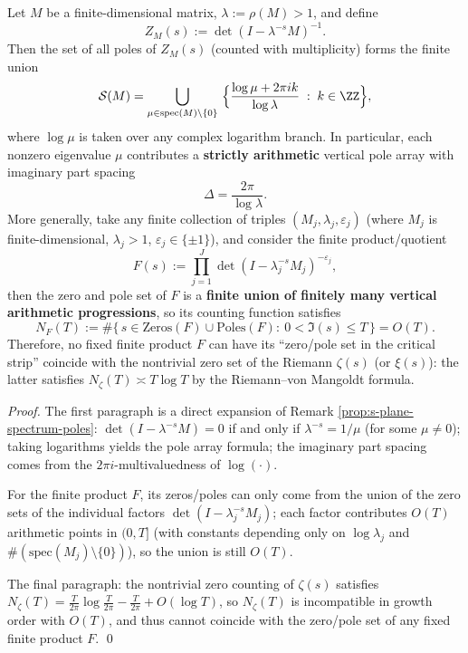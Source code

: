 \begin{proposition}\label{prop:finite-kernel-lattice-obstruction}
Let \(M\) be a finite-dimensional matrix, \(\lambda:=\rho(M)>1\), and define
\[
Z_M(s):=\det(I-\lambda^{-s}M)^{-1}.
\]
Then the set of all poles of \(Z_M(s)\) (counted with multiplicity) forms the finite union
\[
\mathcal{S}(M)=\bigcup_{\mu\in\mathrm{spec}(M)\setminus\{0\}}\ \Bigl\{\frac{\log\mu+2\pi i k}{\log\lambda}\;:\;k\in\ZZ\Bigr\},
\]
where \(\log\mu\) is taken over any complex logarithm branch. In particular, each nonzero eigenvalue \(\mu\) contributes a \textbf{strictly arithmetic} vertical pole array with imaginary part spacing
\[
\Delta=\frac{2\pi}{\log\lambda}.
\]
More generally, take any finite collection of triples \((M_j,\lambda_j,\varepsilon_j)\) (where \(M_j\) is finite-dimensional, \(\lambda_j>1\), \(\varepsilon_j\in\{\pm 1\}\)), and consider the finite product/quotient
\[
F(s):=\prod_{j=1}^{J}\det(I-\lambda_j^{-s}M_j)^{-\varepsilon_j},
\]
then the zero and pole set of \(F\) is a \textbf{finite union of finitely many vertical arithmetic progressions}, so its counting function satisfies
\[
N_F(T):=\#\{\,s\in\mathrm{Zeros}(F)\cup\mathrm{Poles}(F):\ 0<\Im(s)\le T\,\}=O(T).
\]
Therefore, no fixed finite product \(F\) can have its ``zero/pole set in the critical strip'' coincide with the nontrivial zero set of the Riemann \(\zeta(s)\) (or \(\xi(s)\)): the latter satisfies \(N_\zeta(T)\asymp T\log T\) by the Riemann--von Mangoldt formula.
\end{proposition}
\begin{proof}
The first paragraph is a direct expansion of Remark \ref{prop:s-plane-spectrum-poles}: \(\det(I-\lambda^{-s}M)=0\) if and only if \(\lambda^{-s}=1/\mu\) (for some \(\mu\neq 0\)); taking logarithms yields the pole array formula; the imaginary part spacing comes from the \(2\pi i\)-multivaluedness of \(\log(\cdot)\).
\par
For the finite product \(F\), its zeros/poles can only come from the union of the zero sets of the individual factors \(\det(I-\lambda_j^{-s}M_j)\); each factor contributes \(O(T)\) arithmetic points in \((0,T]\) (with constants depending only on \(\log\lambda_j\) and \(\#(\mathrm{spec}(M_j)\setminus\{0\})\)), so the union is still \(O(T)\).
\par
The final paragraph: the nontrivial zero counting of \(\zeta(s)\) satisfies \(N_\zeta(T)=\frac{T}{2\pi}\log\frac{T}{2\pi}-\frac{T}{2\pi}+O(\log T)\), so \(N_\zeta(T)\) is incompatible in growth order with \(O(T)\), and thus cannot coincide with the zero/pole set of any fixed finite product \(F\). \qed
\end{proof}

